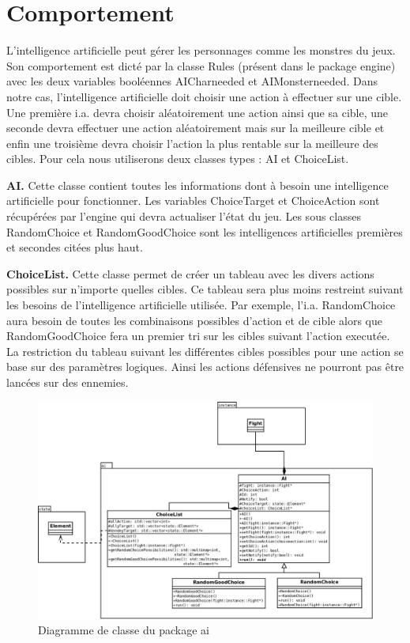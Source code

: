 \documentclass[12pt,a4paper]{report}
\begin{document}
\section{Comportement}

L'intelligence artificielle peut g\'{e}rer les personnages comme les monstres du jeux. Son comportement est dict\'{e} par la classe Rules (pr\'{e}sent dans le package engine) avec les deux variables bool\'{e}ennes AICharneeded et AIMonsterneeded.
Dans notre cas, l'intelligence artificielle doit choisir une action \`{a} effectuer sur une cible. Une premi\`{e}re i.a. devra choisir al\'{e}atoirement une action ainsi que sa cible, une seconde devra effectuer une action al\'{e}atoirement mais sur la meilleure cible et enfin une troisi\`{e}me devra choisir l'action la plus rentable sur la meilleure des cibles.
Pour cela nous utiliserons deux classes types : AI et ChoiceList.

\textbf{AI.} Cette classe contient toutes les informations dont \`{a} besoin une intelligence artificielle pour fonctionner. Les variables ChoiceTarget et ChoiceAction sont r\'{e}cup\'{e}r\'{e}es par l'engine qui devra actualiser l'\'{e}tat du jeu. Les sous classes RandomChoice et RandomGoodChoice sont les intelligences artificielles premi\`{e}res et secondes cit\'{e}es plus haut.

\textbf{ChoiceList.} Cette classe permet de cr\'{e}er un tableau avec les divers actions possibles sur n'importe quelles cibles. Ce tableau sera plus moins restreint suivant les besoins de l'intelligence artificielle utilis\'{e}e. Par exemple, l'i.a. RandomChoice aura besoin de toutes les combinaisons possibles d'action et de cible alors que RandomGoodChoice fera un premier tri sur les cibles suivant l'action execut\'{e}e. La restriction du tableau suivant les diff\'{e}rentes cibles possibles pour une action se base sur des paramètres logiques. Ainsi les actions d\'{e}fensives ne pourront pas \^{e}tre lanc\'{e}es sur des ennemies. 

\begin{figure}
\caption{Diagramme de classe du package ai}
\includegraphics[width=1\textwidth]{ai.jpeg}
\end{figure}
\end{document}
